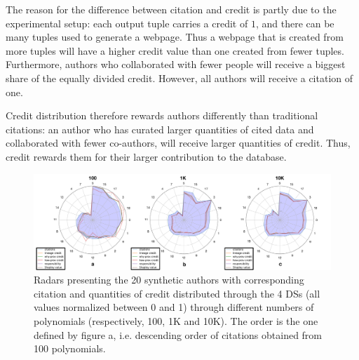 \documentclass[preprint,12pt,sort&compress]{elsarticle}
\newcommand{\rtwo}[1]{\textcolor{reviewer2}{#1}}
\newcommand{\scream}[1]{{\bf * #1 *}{\typeout{#1}}}
\begin{document}
The reason for the difference between citation and credit is partly due to the experimental setup:  each output tuple carries a credit of $1$, and there can be many tuples used to generate a webpage.  Thus a webpage that is created from more tuples will have a higher credit value than one created from fewer tuples. Furthermore, authors who collaborated with fewer people will receive a biggest share of the equally divided credit.  However, all authors will receive a citation of one.

Credit distribution therefore rewards authors differently than traditional citations: an author who has curated larger quantities of cited data and collaborated with fewer co-authors, will receive larger quantities of credit. Thus, credit rewards them for their larger contribution to the database. 




\begin{figure}[t]
\centering
  \includegraphics[width=1\textwidth]{radar}
  \caption{
\rtwo{  Radars presenting the 20 synthetic authors with corresponding citation and quantities of credit distributed through the 4 DSs (all values normalized between 0 and 1) through different numbers of polynomials (respectively, 100, 1K and 10K). 
  The order is the one defined by figure a, i.e. descending order of citations  obtained from 100 polynomials.}}
  \label{figure:3_radars}
\end{figure}
\end{document}

